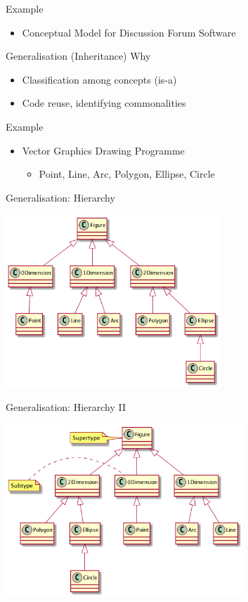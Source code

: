 \documentclass[10pt,t,a4paper]{beamer}
\begin{document}
\begin{frame}[label={sec:org0e2c1e7}]{Example}
\begin{itemize}
\item Conceptual Model for Discussion Forum Software
\end{itemize}
\end{frame}
\begin{frame}[label={sec:orge11461d}]{Generalisation (Inheritance)}
Why
\begin{itemize}
\item Classification among concepts (is-a)
\item Code reuse, identifying commonalities
\end{itemize}

Example
\begin{itemize}
\item Vector Graphics Drawing Programme
\begin{itemize}
\item Point, Line, Arc, Polygon, Ellipse, Circle
\end{itemize}
\end{itemize}
\end{frame}
\begin{frame}[label={sec:org91e3b5f}]{Generalisation: Hierarchy}
\begin{center}
\includegraphics[height=6.5cm]{FInheritance.png}
\end{center}
\end{frame}

\begin{frame}[label={sec:orgb0f2925}]{Generalisation: Hierarchy II}
\begin{center}
\includegraphics[height=6.5cm]{FInheritance2.png}
\end{center}
\end{frame}
\end{document}
